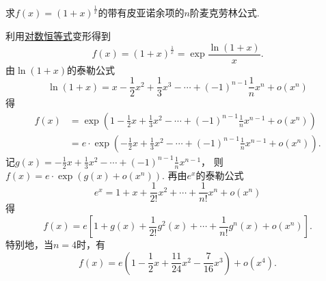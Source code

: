 \begin{example}
求\(f(x) = (1+x)^{\frac1x}\)的带有皮亚诺余项的\(n\)阶麦克劳林公式.
\begin{solution}
利用\hyperref[equation:函数.对数恒等式]{对数恒等式}变形得到\begin{equation*}
	f(x) = (1+x)^{\frac1x}
	= \exp\frac{\ln(1+x)}x.
\end{equation*}
由\(\ln(1+x)\)的泰勒公式\begin{equation*}
	\ln(1+x)
	= x - \frac12 x^2 + \frac13 x^3 - \dotsb
		+ (-1)^{n-1} \frac1n x^n + o(x^n)
\end{equation*}得\begin{align*}
	f(x) &= \exp\left(
		1 - \frac12 x + \frac13 x^2 - \dotsb
		+ (-1)^{n-1} \frac1n x^{n-1} + o(x^n)
	\right) \\
	&= e \cdot \exp(-\frac12 x + \frac13 x^2 - \dotsb + (-1)^{n-1} \frac1n x^{n-1} + o(x^n)).
\end{align*}
记\(g(x) = -\frac12 x + \frac13 x^2 - \dotsb + (-1)^{n-1} \frac1n x^{n-1}\)，
则\(f(x) = e \cdot \exp(g(x) + o(x^n))\).
再由\(e^x\)的泰勒公式\begin{equation*}
	e^x = 1 + x + \frac1{2!} x^2 + \dotsb
	+ \frac1{n!} x^n + o(x^n)
\end{equation*}得\begin{equation*}
	f(x)
	= e \left[ 1 + g(x) + \frac1{2!} g^2(x) + \dotsb + \frac1{n!} g^n(x) + o(x^n) \right].
\end{equation*}
特别地，当\(n=4\)时，有\begin{equation*}
	f(x) = e \left( 1 - \frac12 x + \frac{11}{24} x^2 - \frac7{16} x^3 \right) + o(x^4).
\end{equation*}
\end{solution}
\end{example}

